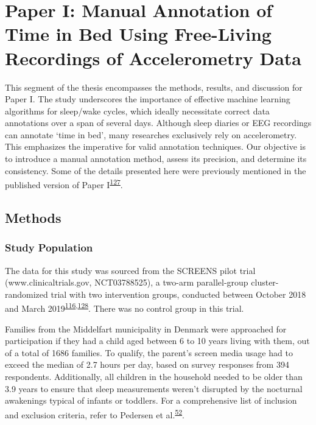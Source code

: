 \documentclass[
  10pt,
]{scrbook}
\begin{document}
\hypertarget{paper-i-manual-annotation-of-time-in-bed-using-free-living-recordings-of-accelerometry-data}{%
\chapter{Paper I: Manual Annotation of Time in Bed Using Free-Living
Recordings of Accelerometry
Data}\label{paper-i-manual-annotation-of-time-in-bed-using-free-living-recordings-of-accelerometry-data}}

This segment of the thesis encompasses the methods, results, and
discussion for Paper I. The study underscores the importance of
effective machine learning algorithms for sleep/wake cycles, which
ideally necessitate correct data annotations over a span of several
days. Although sleep diaries or EEG recordings can annotate `time in
bed', many researches exclusively rely on accelerometry. This emphasizes
the imperative for valid annotation techniques. Our objective is to
introduce a manual annotation method, assess its precision, and
determine its consistency. Some of the details presented here were
previously mentioned in the published version of Paper
I\textsuperscript{\protect\hyperlink{ref-skovgaard_manual_2021}{127}}.

\hypertarget{methods}{%
\section{Methods}\label{methods}}

\hypertarget{study-population}{%
\subsection{Study Population}\label{study-population}}

The data for this study was sourced from the SCREENS pilot trial
(www.clinicaltrials.gov, NCT03788525), a two-arm parallel-group
cluster-randomized trial with two intervention groups, conducted between
October 2018 and March
2019\textsuperscript{\protect\hyperlink{ref-rasmussen_short-term_2020}{116},\protect\hyperlink{ref-rasmussen_feasibility_2021}{128}}.
There was no control group in this trial.

Families from the Middelfart municipality in Denmark were approached for
participation if they had a child aged between 6 to 10 years living with
them, out of a total of 1686 families. To qualify, the parent's screen
media usage had to exceed the median of 2.7 hours per day, based on
survey responses from 394 respondents. Additionally, all children in the
household needed to be older than 3.9 years to ensure that sleep
measurements weren't disrupted by the nocturnal awakenings typical of
infants or toddlers. For a comprehensive list of inclusion and exclusion
criteria, refer to Pedersen et
al.\textsuperscript{\protect\hyperlink{ref-pedersen_self-administered_2021}{52}}.
\end{document}
